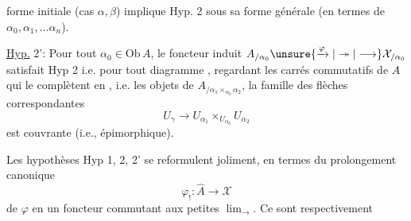 
forme initiale (cas $\alpha,\beta$) implique Hyp. 2 sous sa forme générale (en termes de $\alpha_0,\alpha_1,\ldots\alpha_n$).

\uline{Hyp.} 2': Pour tout $\alpha_0\in\mathrm{Ob}\,A$, le foncteur induit $A_{/\alpha_0}\unsure{\xrightarrow{\varphi}|\twoheadrightarrow|\longrightarrow}\mathcal X_{/\alpha_0}$ satisfait  Hyp 2 i.e. pour tout diagramme
, regardant les carrés commutatifs de $A$ qui le complètent en
, i.e. les objets de $A_{/\alpha_1\times_{\alpha_0}\alpha_2}$, la famille des flèches correspondantes
\[U_\gamma\longrightarrow U_{\alpha_1}\times_{U_{\alpha_0}}U_{\alpha_2}\]
est couvrante (i.e., épimorphique).

Les hypothèses Hyp 1, 2, 2' se reformulent joliment, en termes du prolongement canonique
\[\varphi_!:\widehat A\longrightarrow\mathcal X\]
de $\varphi$ en un foncteur  commutant  aux petites $\lim_{\longrightarrow}$. Ce sont respectivement
